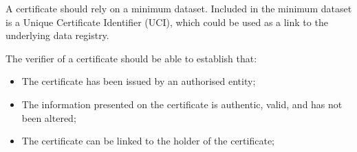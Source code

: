 \documentclass[letterpaper,10pt,english]{sphinxmanual}
\begin{document}
\sphinxAtStartPar
A certificate should rely on a minimum dataset. Included in the minimum dataset is a Unique Certificate Identifier (UCI), which could be used as a link to the underlying data registry.

\sphinxAtStartPar
The verifier of a certificate should be able to establish that:
\begin{itemize}
\item {} 
\sphinxAtStartPar
The certificate has been issued by an authorised entity;

\item {} 
\sphinxAtStartPar
The information presented on the certificate is authentic, valid, and has not been altered;

\item {} 
\sphinxAtStartPar
The certificate can be linked to the holder of the certificate;

\end{itemize}
\end{document}

